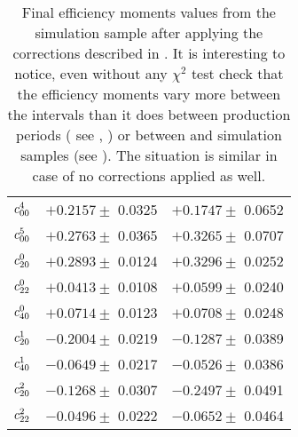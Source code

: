 \begin{table}
\begin{tabular}{c c c}
  $c^{4}_{00}$   &  $+0.2157 \pm$  0.0325  &  $+0.1747 \pm$  0.0652  \\
  $c^{5}_{00}$   &  $+0.2763 \pm$  0.0365  &  $+0.3265 \pm$  0.0707  \\
  $c^{0}_{20}$   &  $+0.2893 \pm$  0.0124  &  $+0.3296 \pm$  0.0252  \\
  $c^{0}_{22}$   &  $+0.0413 \pm$  0.0108  &  $+0.0599 \pm$  0.0240  \\
  $c^{0}_{40}$   &  $+0.0714 \pm$  0.0123  &  $+0.0708 \pm$  0.0248  \\
  $c^{1}_{20}$   &  $-0.2004 \pm$  0.0219  &  $-0.1287 \pm$  0.0389  \\
  $c^{1}_{40}$   &  $-0.0649 \pm$  0.0217  &  $-0.0526 \pm$  0.0386  \\
  $c^{2}_{20}$   &  $-0.1268 \pm$  0.0307  &  $-0.2497 \pm$  0.0491  \\
  $c^{2}_{22}$   &  $-0.0496 \pm$  0.0222  &  $-0.0652 \pm$  0.0464  \\
  \hline
\end{tabular}
\caption{Final efficiency moments values from the \BsbarJpsiKst simulation sample after applying the corrections described in
         . It is interesting to notice, even without any $\chi^2$ test check that the
         efficiency moments vary more between the \mkpi intervals than it does between production periods ( see , )
         or between \BsJpsiKst and \BsbarJpsiKst simulation samples (see ). The situation is
         similar in case of no corrections applied as well. }
\label{moms_final_pos}
\end{table}


